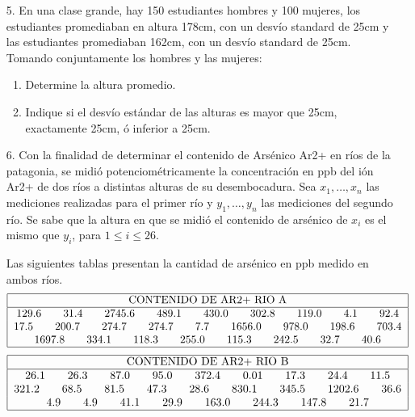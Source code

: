 \documentclass[a4paper, 11pt]{article}
\begin{document}
\begin{enumerate}
\item[5.] En una clase grande, hay 150 estudiantes hombres y 100 mujeres, los
estudiantes promediaban en altura 178cm, con un desvío standard de 25cm y
las estudiantes promediaban 162cm, con un desvío standard de 25cm.
Tomando conjuntamente los hombres y las mujeres:


\begin{enumerate}
\item Determine la altura promedio.

\item Indique si el desvío estándar de las alturas es
mayor que 25cm, exactamente 25cm, ó inferior a 25cm.
\end{enumerate}


\item[6.] Con la finalidad de determinar el contenido de Arsénico Ar2+ en ríos de la patagonia, se midió potenciométricamente la concentración en ppb del ión Ar2+ de dos ríos a distintas alturas de su desembocadura. Sea $x_1, \ldots, x_n$ las mediciones realizadas para el primer río y $y_1, \ldots, y_n$ las mediciones del segundo río. Se sabe que la altura en que se midió el contenido de arsénico de $x_i$ es el mismo que $y_i$, para $1 \leq i \leq 26$.

Las siguientes tablas presentan la cantidad de arsénico en ppb medido en ambos ríos.%
\[%
\begin{tabular}
[c]{|c|}\hline
CONTENIDO DE AR2+ RIO A\\\hline
129.6\qquad31.4\qquad2745.6\qquad489.1\qquad430.0\qquad302.8\qquad
119.0\qquad4.1\qquad92.4\\
17.5\qquad200.7\qquad274.7\qquad274.7\qquad7.7\qquad1656.0\qquad
978.0\qquad198.6\qquad703.4\\
1697.8\qquad334.1\qquad118.3\qquad255.0\qquad115.3\qquad242.5\qquad
32.7\qquad40.6\\\hline
\end{tabular}
\
\]%
\[%
\begin{tabular}
[c]{|c|}\hline
CONTENIDO DE AR2+ RIO B\\\hline
26.1\qquad26.3\qquad87.0\qquad95.0\qquad372.4\qquad0.01\qquad17.3\qquad
24.4\qquad11.5\\
321.2\qquad68.5\qquad81.5\qquad47.3\qquad28.6\qquad830.1\qquad345.5\qquad
1202.6\qquad36.6\\
4.9\qquad4.9\qquad41.1\qquad29.9\qquad163.0\qquad244.3\qquad147.8\qquad
21.7\\\hline
\end{tabular}
\
\]





\end{enumerate}
\end{document}
